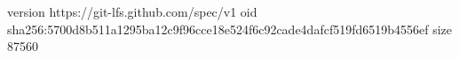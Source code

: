 version https://git-lfs.github.com/spec/v1
oid sha256:5700d8b511a1295ba12c9f96cce18e524f6c92cade4dafcf519fd6519b4556ef
size 87560
